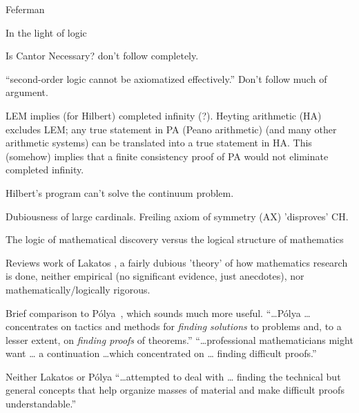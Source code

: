 \begin{plSection}{Feferman}
\begin{plSection}{In the light of logic}
\begin{plSection}{Is Cantor Necessary?}
don't follow completely.

``second-order logic cannot be axiomatized effectively.''
Don't follow much of argument.

\hfill\break
LEM implies (for Hilbert) completed infinity (?).
\hfill\break
Heyting arithmetic (HA) excludes LEM;
any true statement in PA (Peano arithmetic) 
(and many other arithmetic systems)
can be translated into
a true statement in HA.
\hfill\break
This (somehow) implies that a finite consistency proof
of PA would not eliminate completed infinity.

\hfill\break
Hilbert's program can't solve the continuum problem.


\hfill\break
Dubiousness of large cardinals.
\hfill\break
Freiling axiom of 
symmetry (AX) 
'disproves' CH.

\end{plSection}%
\begin{plSection}{The logic of mathematical discovery 
versus the logical structure of mathematics}
\label{sec:logic_of_mathematical_discovery}


Reviews work of Lakatos ,
a fairly dubious 'theory' of how mathematics research is done,
neither empirical (no significant evidence, just anecdotes),
nor mathematically/logically rigorous.

Brief comparison to 
P\'{o}lya~\cite[ch~3,sec~7]{Feferman:1998:LightOfLogic},
which sounds much more useful. 
``\ldots P\'{o}lya \ldots concentrates on tactics and methods
for \textit{finding solutions} to problems and, 
to a lesser extent,
on \textit{finding proofs} of theorems.''
\hfill\break
``\ldots professional mathematicians might want \ldots
a continuation \ldots which concentrated on \ldots
finding difficult proofs.''

Neither Lakatos or P\'{o}lya ``\ldots attempted to deal with 
\ldots
finding the technical but general concepts that 
help organize masses of material and make difficult 
proofs understandable.''


\end{plSection}
\end{plSection}
\end{plSection}

